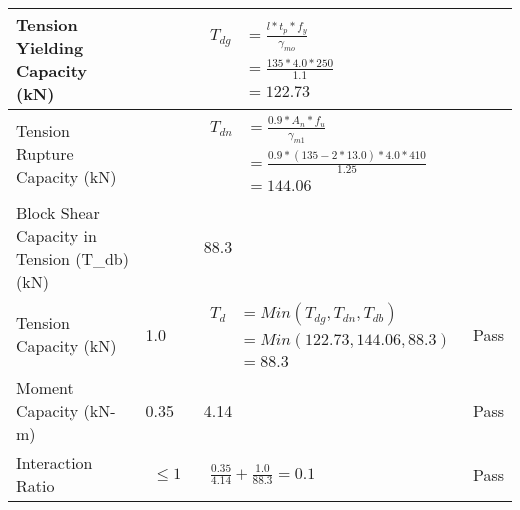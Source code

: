 \documentclass{article}%
\begin{document}
\begin{longtable}{|p{4cm}|p{5cm}|p{5.5cm}|p{1.5cm}|}
\hline%
Tension Yielding Capacity (kN)&&$\begin{aligned} T_{dg} &= \frac{l*t_p*f_y}{\gamma_{mo}}\\ &=\frac{135*4.0*250}{1.1}\\ &=122.73\end{aligned}$&\\%
\hline%
Tension Rupture Capacity (kN)&&$\begin{aligned} T_{dn} &= \frac{0.9*A_{n}*f_u}{\gamma_{m1}}\\ &=\frac{0.9*(135-2*13.0)*4.0*410}{1.25}\\ &=144.06\end{aligned}$&\\%
\hline%
Block Shear Capacity in Tension (T\_db) (kN)&&88.3&\\%
\hline%
Tension Capacity (kN)&1.0&$\begin{aligned} T_d &= Min(T_{dg},T_{dn},T_{db})\\ &= Min(122.73,144.06,88.3)\\ &=88.3\end{aligned}$&Pass\\%
\hline%
Moment Capacity (kN{-}m)&0.35&4.14&Pass\\%
\hline%
Interaction Ratio&$\begin{aligned} \leq1\end{aligned}$&$\begin{aligned} \frac{0.35}{4.14}+\frac{1.0}{88.3}=0.1\end{aligned}$&Pass\\%
\hline%
\end{longtable}

%
\newpage%
\end{document}
